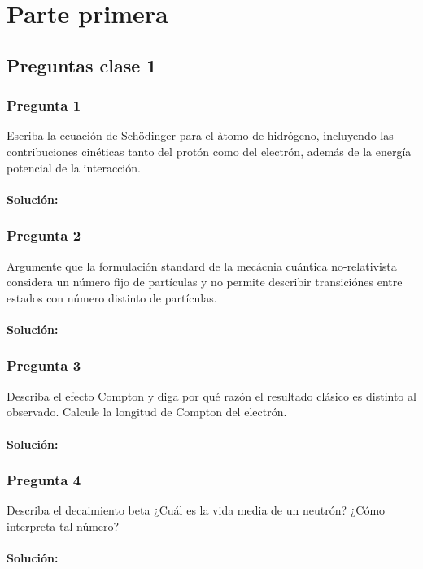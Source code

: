 \documentclass[../main_ej.tex]{subfiles}
\begin{document}
\chapter{Parte primera}
\section{Preguntas clase 1}
\subsection{Pregunta 1}
Escriba la ecuación de Schödinger para el àtomo de hidrógeno, incluyendo las contribuciones cinéticas tanto del protón como del electrón, además de la energía potencial de la interacción.
\\
\\
\textbf{Solución:}
\subsection{Pregunta 2}
Argumente que la formulación standard de la mecácnia cuántica no-relativista considera un número fijo de partículas y no permite describir transiciónes entre estados con número distinto de partículas. \\
\\
\textbf{Solución:}
\subsection{Pregunta 3}
Describa el efecto Compton y diga por qué razón el resultado clásico es distinto al observado. Calcule la longitud de Compton del electrón. \\
\\
\textbf{Solución:}
\subsection{Pregunta 4}
Describa el decaimiento beta ¿Cuál es la vida media de un neutrón? ¿Cómo interpreta tal número? \\
\\
\textbf{Solución:}
\end{document}
